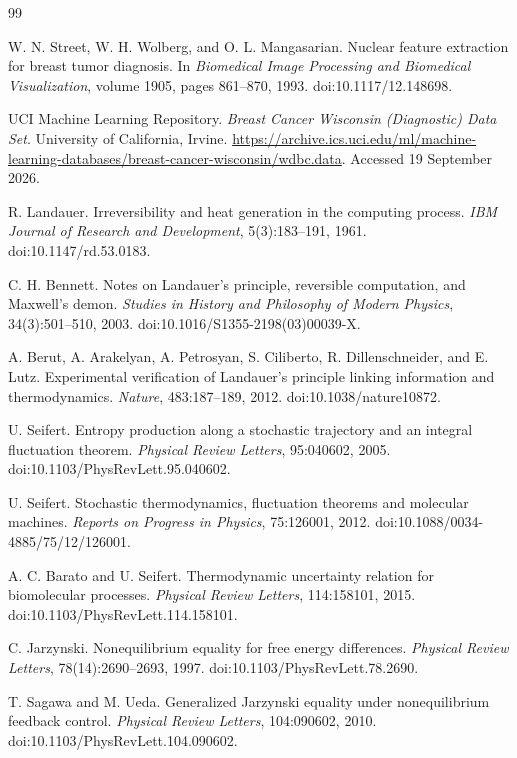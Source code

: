 \documentclass[11pt,a4paper]{article}
\newcommand{\1}{\mathbf{1}}
\begin{document}
\begin{thebibliography}{99}

W. N. Street, W. H. Wolberg, and O. L. Mangasarian.
Nuclear feature extraction for breast tumor diagnosis.
In \emph{Biomedical Image Processing and Biomedical Visualization}, volume 1905, pages 861--870, 1993.
doi:10.1117/12.148698.

UCI Machine Learning Repository.
\emph{Breast Cancer Wisconsin (Diagnostic) Data Set}.
University of California, Irvine.
\url{https://archive.ics.uci.edu/ml/machine-learning-databases/breast-cancer-wisconsin/wdbc.data}.
Accessed 19 September 2026.

R. Landauer.
Irreversibility and heat generation in the computing process.
\emph{IBM Journal of Research and Development}, 5(3):183--191, 1961.
doi:10.1147/rd.53.0183.

C. H. Bennett.
Notes on Landauer's principle, reversible computation, and Maxwell's demon.
\emph{Studies in History and Philosophy of Modern Physics}, 34(3):501--510, 2003.
doi:10.1016/S1355-2198(03)00039-X.

A. Berut, A. Arakelyan, A. Petrosyan, S. Ciliberto, R. Dillenschneider, and E. Lutz.
Experimental verification of Landauer's principle linking information and thermodynamics.
\emph{Nature}, 483:187--189, 2012.
doi:10.1038/nature10872.

U. Seifert.
Entropy production along a stochastic trajectory and an integral fluctuation theorem.
\emph{Physical Review Letters}, 95:040602, 2005.
doi:10.1103/PhysRevLett.95.040602.

U. Seifert.
Stochastic thermodynamics, fluctuation theorems and molecular machines.
\emph{Reports on Progress in Physics}, 75:126001, 2012.
doi:10.1088/0034-4885/75/12/126001.

A. C. Barato and U. Seifert.
Thermodynamic uncertainty relation for biomolecular processes.
\emph{Physical Review Letters}, 114:158101, 2015.
doi:10.1103/PhysRevLett.114.158101.

C. Jarzynski.
Nonequilibrium equality for free energy differences.
\emph{Physical Review Letters}, 78(14):2690--2693, 1997.
doi:10.1103/PhysRevLett.78.2690.

T. Sagawa and M. Ueda.
Generalized Jarzynski equality under nonequilibrium feedback control.
\emph{Physical Review Letters}, 104:090602, 2010.
doi:10.1103/PhysRevLett.104.090602.


\end{thebibliography}
\end{document}
